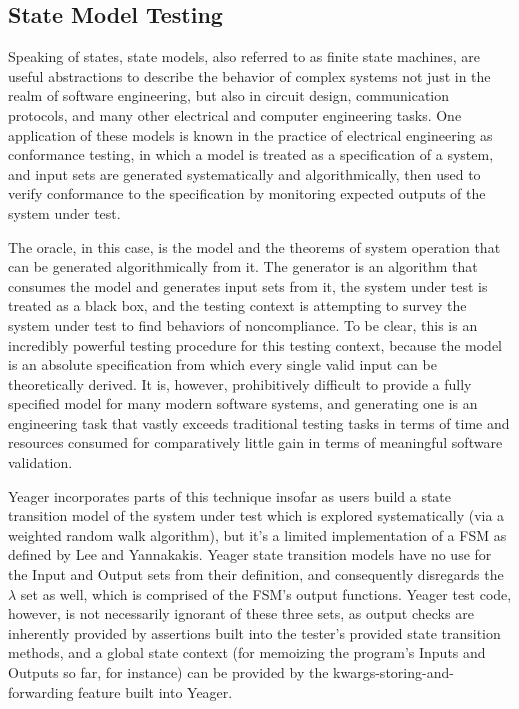 \subsection{State Model Testing}
Speaking of states, state models, also referred to as finite state machines, are useful abstractions to describe the behavior of complex systems not just in the realm of software engineering, but also in circuit design, communication protocols, and many other electrical and computer engineering tasks. One application of these models is known in the practice of electrical engineering as conformance testing, in which a model is treated as a specification of a system, and input sets are generated systematically and algorithmically, then used to verify conformance to the specification by monitoring expected outputs of the system under test.\citep{lee1996principles}

The oracle, in this case, is the model and the theorems of system operation that can be generated algorithmically from it. The generator is an algorithm that consumes the model and generates input sets from it, the system under test is treated as a black box, and the testing context is attempting to survey the system under test to find behaviors of noncompliance. To be clear, this is an incredibly powerful testing procedure for this testing context, because the model is an absolute specification from which every single valid input can be theoretically derived. It is, however, prohibitively difficult to provide a fully specified model for many modern software systems, and generating one is an engineering task that vastly exceeds traditional testing tasks in terms of time and resources consumed for comparatively little gain in terms of meaningful software validation.

Yeager incorporates parts of this technique insofar as users build a state transition model of the system under test which is explored systematically (via a weighted random walk algorithm), but it's a limited implementation of a FSM as defined by Lee and Yannakakis. Yeager state transition models have no use for the Input and Output sets from their definition, and consequently disregards the $\lambda$ set as well, which is comprised of the FSM's output functions. Yeager test code, however, is not necessarily ignorant of these three sets, as output checks are inherently provided by assertions built into the tester's provided state transition methods, and a global state context (for memoizing the program's Inputs and Outputs so far, for instance) can be provided by the kwargs-storing-and-forwarding feature built into Yeager.

